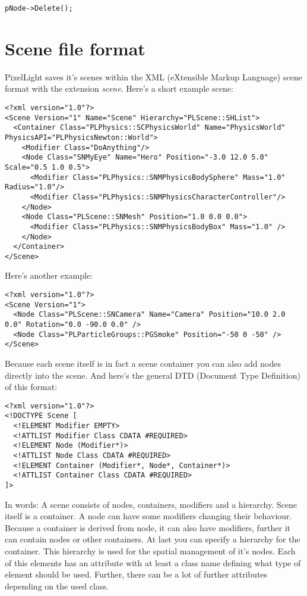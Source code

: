 \begin{lstlisting}[caption=Delete a scene node]
pNode->Delete();
\end{lstlisting}




\section{Scene file format}
PixelLight saves it's scenes within the XML (eXtensible Markup Language) scene format with the extension \emph{scene}. Here's a short example scene:

\begin{lstlisting}[caption=Scene file example]
<?xml version="1.0"?>
<Scene Version="1" Name="Scene" Hierarchy="PLScene::SHList">
  <Container Class="PLPhysics::SCPhysicsWorld" Name="PhysicsWorld" PhysicsAPI="PLPhysicsNewton::World">
    <Modifier Class="DoAnything"/>
    <Node Class="SNMyEye" Name="Hero" Position="-3.0 12.0 5.0" Scale="0.5 1.0 0.5">
      <Modifier Class="PLPhysics::SNMPhysicsBodySphere" Mass="1.0" Radius="1.0"/>
      <Modifier Class="PLPhysics::SNMPhysicsCharacterController"/>
    </Node>
    <Node Class="PLScene::SNMesh" Position="1.0 0.0 0.0">
      <Modifier Class="PLPhysics::SNMPhysicsBodyBox" Mass="1.0" />
    </Node>
  </Container>
</Scene>
\end{lstlisting}

Here's another example:

\begin{lstlisting}[caption=Another scene file example]
<?xml version="1.0"?>
<Scene Version="1">
  <Node Class="PLScene::SNCamera" Name="Camera" Position="10.0 2.0 0.0" Rotation="0.0 -90.0 0.0" />
  <Node Class="PLParticleGroups::PGSmoke" Position="-50 0 -50" />
</Scene>
\end{lstlisting}

Because each scene itself is in fact a scene container you can also add nodes directly into the scene. And here's the general DTD (Document Type Definition) of this format:

\begin{lstlisting}[caption=Scene file format DTD]
<?xml version="1.0"?>
<!DOCTYPE Scene [
  <!ELEMENT Modifier EMPTY>
  <!ATTLIST Modifier Class CDATA #REQUIRED>
  <!ELEMENT Node (Modifier*)>
  <!ATTLIST Node Class CDATA #REQUIRED>
  <!ELEMENT Container (Modifier*, Node*, Container*)>
  <!ATTLIST Container Class CDATA #REQUIRED>
]>
\end{lstlisting}

In words: A scene consists of nodes, containers, modifiers and a hierarchy. Scene itself is a container. A node can have some modifiers changing their behaviour. Because a container is derived from node, it can also have modifiers, further it can contain nodes or other containers. At last you can specify a hierarchy for the container. This hierarchy is used for the spatial management of it's nodes. Each of this elements has an attribute with at least a class name defining what type of element should be used. Further, there can be a lot of further attributes depending on the used class.




